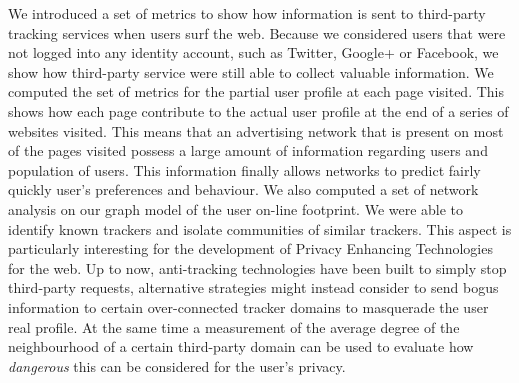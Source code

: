We introduced a set of metrics to show how information is sent to third-party tracking services when users surf the web. Because we considered users that were not logged into any identity account, such as Twitter, Google+ or Facebook, we show how third-party service were still able to collect valuable information.
We computed the set of metrics for the partial user profile at each page visited. This shows how each page contribute to the actual user profile at the end of a series of websites visited. This means that an advertising network that is present on most of the pages visited possess a large amount of information regarding users and population of users. This information finally allows networks to predict fairly quickly user's preferences and behaviour.
We also computed a set of network analysis on our graph model of the user on-line footprint. We were able to identify known trackers and isolate communities of similar trackers. This aspect is particularly interesting for the development of Privacy Enhancing Technologies for the web. Up to now, anti-tracking technologies have been built to simply stop third-party requests, alternative strategies might instead consider to send bogus information to certain over-connected tracker domains to masquerade the user real profile. At the same time a measurement of the average degree of the neighbourhood of a certain third-party domain can be used to evaluate how \emph{dangerous} this can be considered for the user's privacy.
